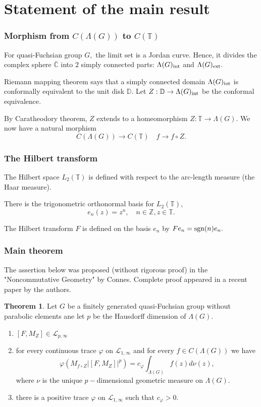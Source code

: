 \documentclass{beamer}
\theoremstyle{definition}
\newtheorem{thm}{Theorem}
\begin{document}
\section{Statement of the main result}

\begin{frame}
\frametitle{Morphism from $C(\Lambda(G))$ to $C(\mathbb{T})$}

For quasi-Fuchsian group $G,$ the limit set is a Jordan curve. Hence, it divides the complex sphere $\bar{\mathbb{C}}$ into $2$ simply connected parts: $\Lambda(G)_{{\rm int}}$ and $\Lambda(G)_{{\rm ext}}.$ 

Riemann mapping theorem says that a simply connected domain $\Lambda(G)_{{\rm int}}$ is conformally equivalent to the unit disk $\mathbb{D}.$ Let $Z:\mathbb{D}\to \Lambda(G)_{{\rm int}}$ be the conformal equivalence. 

By Caratheodory theorem, $Z$ extends to a homeomorphism $Z:\mathbb{T}\to\Lambda(G).$ We now have a natural morphism 
$$C(\Lambda(G))\to C(\mathbb{T})\quad f\to f\circ Z.$$
\end{frame}

\begin{frame}\frametitle{The Hilbert transform}
The Hilbert space $L_2(\mathbb{T})$ is defined with respect to the arc-length measure (the Haar measure).
    
There is the trigonometric orthonormal basis for $L_2(\mathbb{T})$,
\begin{equation*}
e_n(z) = z^n,\quad n\in \mathbb{Z}, z \in \mathbb{T}.
\end{equation*}

The Hilbert transform $F$ is defined on the basis $e_n$ by $Fe_n = {\rm sgn}(n)e_n.$
\end{frame}

\begin{frame}
\frametitle{Main theorem}

The assertion below was proposed (without rigorous proof) in the "Noncommutative Geometry" by Connes. Complete proof appeared in a recent paper by the authors.

\begin{thm} Let $G$ be a finitely generated quasi-Fuchsian group without parabolic elements ane let $p$ be the Hausdorff dimension of $\Lambda(G).$ 
\begin{enumerate}[{\rm (a)}]
\item $[F,M_Z]\in\mathcal{L}_{p,\infty}$
\item for every continuous trace $\varphi$ on $\mathcal{L}_{1,\infty}$ and for every $f\in C(\Lambda(G))$ we have
$$\varphi(M_{f\circ Z}|[F,M_Z]|^p)=c_{\varphi}\int_{\Lambda(G)}f(z)d\nu(z),$$
where $\nu$ is the unique $p-$dimensional geometric measure on $\Lambda(G).$
\item there is a positive trace $\varphi$ on $\mathcal{L}_{1,\infty}$ such that $c_{\varphi}>0.$
\end{enumerate}
\end{thm}
\end{frame}
\end{document}
